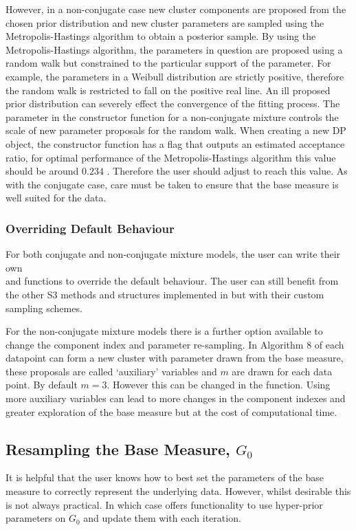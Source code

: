 \documentclass[nojss]{jss}
\begin{document}
However, in a non-conjugate case new cluster components are proposed from the chosen prior distribution and new cluster parameters are sampled using the Metropolis-Hastings algorithm to obtain a posterior sample. By using the Metropolis-Hastings algorithm, the parameters in question are proposed using a random walk but constrained to the particular support of the parameter. For example, the parameters in a Weibull distribution are strictly positive, therefore the random walk is restricted to fall on the positive real line. An ill proposed prior distribution can severely effect the convergence of the fitting process. The parameter  in the constructor function for a non-conjugate mixture controls the scale of new parameter proposals for the random walk. When creating a new DP object, the constructor function has a flag  that outputs an estimated acceptance ratio, for optimal performance of the Metropolis-Hastings algorithm this value should be around $0.234$ \citep{gelman_efficient_1996}. Therefore the user should adjust  to reach this value. As with the conjugate case, care must be taken to ensure that the base measure is well suited for the data.

\subsubsection{Overriding Default Behaviour}
For both conjugate and non-conjugate mixture models, the user can write their own \\  and  functions to override the default behaviour. The user can still benefit from the other S3 methods and structures implemented in  but with their custom sampling schemes.

For the non-conjugate mixture models there is a further option available to change the component index and parameter re-sampling. In Algorithm 8 of \cite{neal_markov_2000} each datapoint can form a new cluster with parameter drawn from the base measure, these proposals are called `auxiliary' variables and $m$ are drawn for each data point. By default $m=3$. However this can be changed in the  function. Using more auxiliary variables can lead to more changes in the component indexes and greater exploration of the base measure but at the cost of computational time.

\subsection{Resampling the Base Measure, $G_0$}
It is helpful that the user knows how to best set the parameters of the base measure to correctly represent the underlying data. However, whilst desirable this is not always practical. In which case  offers functionality to use hyper-prior parameters on $G_0$ and update them with each iteration.
\end{document}
